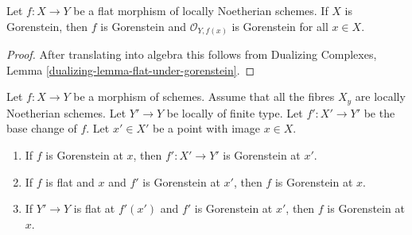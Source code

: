 \begin{lemma}
\label{lemma-flat-morphism-from-gorenstein-scheme}
Let $f : X \to Y$ be a flat morphism of locally Noetherian schemes.
If $X$ is Gorenstein, then $f$ is Gorenstein and $\mathcal{O}_{Y, f(x)}$
is Gorenstein for all $x \in X$.
\end{lemma}

\begin{proof}
After translating into algebra this follows from
Dualizing Complexes, Lemma \ref{dualizing-lemma-flat-under-gorenstein}.
\end{proof}

\begin{lemma}
\label{lemma-base-change-gorenstein}
Let $f : X \to Y$ be a morphism of schemes.
Assume that all the fibres $X_y$ are locally Noetherian schemes.
Let $Y' \to Y$ be locally of finite type. Let $f' : X' \to Y'$
be the base change of $f$.
Let $x' \in X'$ be a point with image $x \in X$.
\begin{enumerate}
\item If $f$ is Gorenstein at $x$, then
$f' : X' \to Y'$ is Gorenstein at $x'$.
\item If $f$ is flat and $x$ and $f'$ is Gorenstein at $x'$, then $f$
is Gorenstein at $x$.
\item If $Y' \to Y$ is flat at $f'(x')$ and $f'$ is Gorenstein at
$x'$, then $f$ is Gorenstein at $x$.
\end{enumerate}
\end{lemma}

